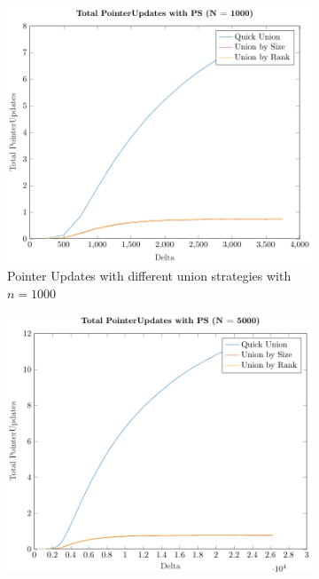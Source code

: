 \begin{figure}[ht]
    \centering
    \begin{subfigure}{0.32\textwidth}
        \centering
        \includegraphics[width=\textwidth]{../images/plotPSFull1000_PointerUpdates.pdf}
        \caption{Pointer Updates with different union strategies with $n = 1000$}
    \end{subfigure}%
    \hfill
    \begin{subfigure}{0.32\textwidth}
        \centering
        \includegraphics[width=\textwidth]{../images/plotPSFull5000_PointerUpdates.pdf}

\end{subfigure}
\end{figure}
